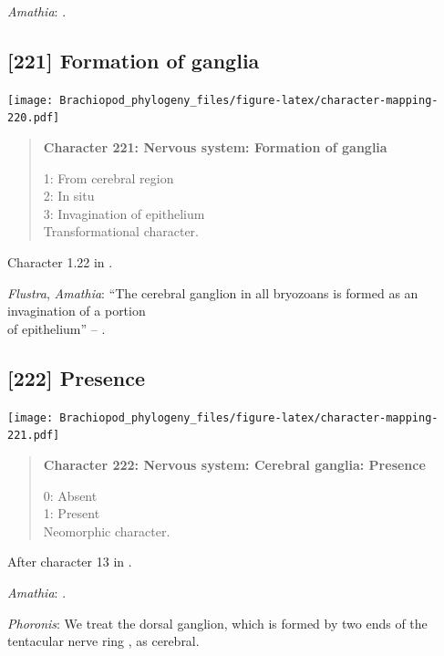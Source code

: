 \documentclass[openany]{book}
\begin{document}
\hypertarget{Amathia-coding-220}{}
\emph{Amathia}: \citet{Temereva2016Thenervous}.

\subsection*{{[}221{]} Formation of ganglia}\label{formation-of-ganglia}

\texttt{[image: Brachiopod\_phylogeny\_files/figure-latex/character-mapping-220.pdf]}

\begin{quote}
\textbf{Character 221: Nervous system: Formation of ganglia}

1: From cerebral region\\
2: In situ\\
3: Invagination of epithelium\\
Transformational character.
\end{quote}

Character 1.22 in \citet{SPS1996}.

\hypertarget{Amathia-coding-221}{}
\emph{Flustra}, \emph{Amathia}: ``The cerebral ganglion in all bryozoans
is formed as an invagination of a portion\\
of epithelium'' -- \citet{Temereva2016Thenervous}.

\subsection*{{[}222{]} Presence}\label{presence-6}

\texttt{[image: Brachiopod\_phylogeny\_files/figure-latex/character-mapping-221.pdf]}

\begin{quote}
\textbf{Character 222: Nervous system: Cerebral ganglia: Presence}

0: Absent\\
1: Present\\
Neomorphic character.
\end{quote}

After character 13 in \citet{Haszprunar1996}.

\hypertarget{Amathia-coding-222}{}
\emph{Amathia}: \citet{Temereva2016Thenervous}.

\hypertarget{Phoronis-coding-222}{}
\emph{Phoronis}: We treat the dorsal ganglion, which is formed by two
ends of the tentacular nerve ring \citep{Temereva2016Phoronida}, as
cerebral.
\end{document}
